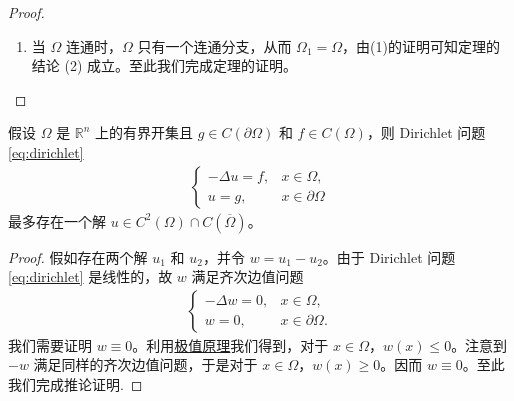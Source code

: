\documentclass[../../main.tex]{subfiles}%
\begin{document}
\begin{proof}
\begin{enumerate}[(1)]
这样我们证明了在 $\Omega$ 的包含 $x_0$ 的连通分支 $\Omega_1$ 上，$u(x)$ 恒为常数 $M$。由于函数 $u(x)$ 的连续性，$u(x)$ 在 $\Omega_1$ 的边界 $\partial\Omega_1$ 上也恒为常数 $M$。而由知$\partial\Omega_1$ 是 $\Omega$ 的边界 $\partial\Omega$ 的一部分，从而得到定理的结论 (1) 成立。

\item 当 $\Omega$ 连通时，$\Omega$ 只有一个连通分支，从而 $\Omega_1=\Omega$，由(1)的证明可知定理的结论 (2) 成立。至此我们完成定理的证明。
\end{enumerate}
\end{proof}

\begin{corollary}
假设 $\Omega$ 是 $\mathbb{R}^n$ 上的有界开集且 $g\in C(\partial\Omega)$ 和 $f\in C(\Omega)$，则 Dirichlet 问题 \eqref{eq:dirichlet} 
\begin{align}
\begin{cases}
-\Delta u = f, & x\in\Omega, \\
u = g, & x\in\partial\Omega
\end{cases} \label{eq:dirichlet}
\end{align}
最多存在一个解 $u\in C^2(\Omega)\cap C(\overline{\Omega})$。
\end{corollary}
\begin{proof}
假如存在两个解 $u_1$ 和 $u_2$，并令 $w=u_1-u_2$。由于 Dirichlet 问题 \eqref{eq:dirichlet} 是线性的，故 $w$ 满足齐次边值问题
\begin{align*}
\begin{cases}
-\Delta w = 0, & x\in\Omega, \\
w = 0, & x\in\partial\Omega.
\end{cases}
\end{align*}
我们需要证明 $w\equiv 0$。利用\hyperref[theorem:PED-强极值原理]{极值原理}我们得到，对于 $x\in\Omega$，$w(x)\leqslant 0$。注意到 $-w$ 满足同样的齐次边值问题，于是对于 $x\in\Omega$，$w(x)\geqslant 0$。因而 $w\equiv 0$。至此我们完成推论证明.
\end{proof}
\end{document}
